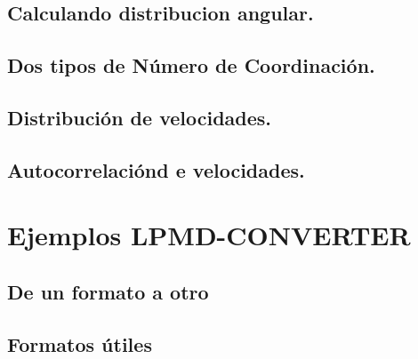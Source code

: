 \subsection{Calculando distribucion angular.}

\subsection{Dos tipos de N\'umero de Coordinaci\'on.}

\subsection{Distribuci\'on de velocidades.}

\subsection{Autocorrelaci\'ond e velocidades.}

\section{Ejemplos LPMD-CONVERTER}

\subsection{De un formato a otro}

\subsection{Formatos \'utiles}
